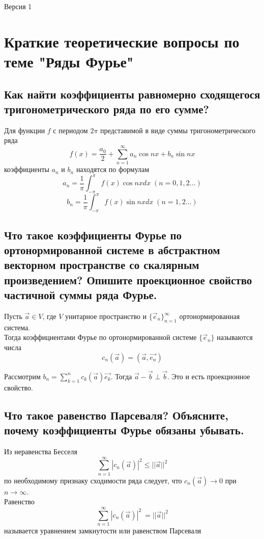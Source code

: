 \documentclass{article}
\begin{document}
\begin{flushright}
	Версия 1
\end{flushright}
\section{Краткие теоретические вопросы по теме "Ряды Фурье"}

\subsection{Как найти коэффициенты равномерно сходящегося тригонометрического ряда по его сумме?}
Для функции $f$ с периодом $2\pi$ представимой в виде суммы тригонометрического ряда 
\[f(x) = \frac{a_0}{2}+\sum_{n=1}^{\infty}a_n \cos nx +b_n \sin nx\]
коэффициенты $a_n$ и $b_n$ находятся по формулам
\[a_n = \frac{1}{\pi}\int_{-\pi}^\pi f(x)\cos n x dx\; (n = 0, 1, 2 ...)\]
\[b_n = \frac{1}{\pi}\int_{-\pi}^\pi f(x)\sin n x dx\; (n = 1, 2 ...)\]



\subsection{Что такое коэффициенты Фурье по ортонормированной системе в абстрактном векторном пространстве со скалярным произведением? Опишите проекционное свойство частичной суммы ряда Фурье.}
Пусть $\vec{a} \in V$, где $V$ унитарное пространство и $\{\vec{e}_n\}_{n=1}^{\infty}$ ортонормированная система.\\
Тогда коэффициентами Фурье по ортонормированной системе $\{\vec{e}_n\}$ называются числа 
\[ c_n(\vec{a}) = (\vec{a}, \vec{e_n})\]

Рассмотрим $b_n = \sum_{k=1}^n c_k(\vec{a})\vec{e_k}$. Тогда $\vec{a}-\vec{b} \perp \vec{b}$. Это и есть проекционное свойство.



\subsection{Что такое равенство Парсеваля? Объясните, почему коэффициенты Фурье обязаны убывать.}
Из неравенства Бесселя 
\[\sum_{n=1}^{\infty}|c_n(\vec{a})|^2\leq ||\vec{a}||^2\]
по необходимому признаку сходимости ряда следует, что $c_n(\vec{a}) \rightarrow 0$ при $n \rightarrow \infty$.\\
Равенство 
\[\sum_{n=1}^{\infty}|c_n(\vec{a})|^2\ = ||\vec{a}||^2\]
называется уравнением замкнутости или равенством Парсеваля
\end{document}
